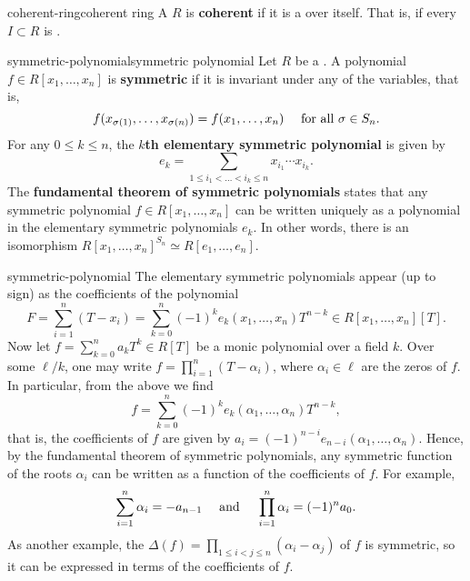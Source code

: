 \begin{topic}{coherent-ring}{coherent ring}
    A  $R$ is \textbf{coherent} if it is a  over itself. That is, if every   $I \subset R$ is .
\end{topic}

\begin{topic}{symmetric-polynomial}{symmetric polynomial}
    Let $R$ be a . A polynomial $f \in R[x_1, \ldots, x_n]$ is \textbf{symmetric} if it is invariant under any  of the variables, that is,
    \[ f(x_{\sigma(1)}, \ldots, x_{\sigma(n)}) = f(x_1, \ldots, x_n) \quad \textup{ for all } \sigma \in S_n . \]
    For any $0 \le k \le n$, the \textbf{$k$th elementary symmetric polynomial} is given by
    \[ e_k = \sum_{1 \le i_1 < \ldots < i_k \le n} x_{i_1} \cdots x_{i_k} . \]
    The \textbf{fundamental theorem of symmetric polynomials} states that any symmetric polynomial $f \in R[x_1, \ldots, x_n]$ can be written uniquely as a polynomial in the elementary symmetric polynomials $e_k$. In other words, there is an isomorphism $R[x_1, \ldots, x_n]^{S_n} \simeq R[e_1, \ldots, e_n]$.
\end{topic}

\begin{example}{symmetric-polynomial}
    The elementary symmetric polynomials appear (up to sign) as the coefficients of the polynomial
    \[ F = \sum_{i = 1}^{n} (T - x_i) = \sum_{k = 0}^{n} (-1)^k e_k (x_1, \ldots, x_n) T^{n - k} \in R[x_1, \ldots, x_n][T]  .\]
    Now let $f = \sum_{k = 0}^{n} a_k T^k \in R[T]$ be a monic polynomial over a field $k$. Over some  $\ell/k$, one may write $f = \prod_{i = 1}^{n} (T - \alpha_i)$, where $\alpha_i \in \ell$ are the zeros of $f$. In particular, from the above we find
    \[ f = \sum_{k = 0}^{n} (-1)^k e_k(\alpha_1, \ldots, \alpha_n) T^{n - k} , \]
    that is, the coefficients of $f$ are given by $a_i = (-1)^{n - i} e_{n - i}(\alpha_1, \ldots, \alpha_n)$. Hence, by the fundamental theorem of symmetric polynomials, any symmetric function of the roots $\alpha_i$ can be written as a function of the coefficients of $f$. For example,
    \[ \sum_{i = 1}^{n} \alpha_i = - a_{n - 1} \quad \textup{ and } \quad \prod_{i = 1}^{n} \alpha_i = (-1)^n a_0 . \]
    As another example, the  $\Delta(f) = \prod_{1 \le i < j \le n} (\alpha_i - \alpha_j)$ of $f$ is symmetric, so it can be expressed in terms of the coefficients of $f$.
\end{example}

